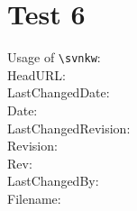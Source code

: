 \documentclass[12pt]{report}
\begin{document}
\chapter{Test 6}
Usage of \verb+\svnkw+:\\

\noindent
HeadURL:  \\
LastChangedDate:  \\
Date:  \\
LastChangedRevision:  \\
Revision:  \\
Rev:  \\
LastChangedBy:  \\
Filename:  \\
\end{document}
